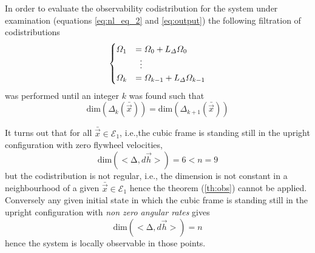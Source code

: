\par
In order to evaluate the observability codistribution for the system under examination
(equations \ref{eq:nl_eq_2} and \ref{eq:output}) the following filtration of codistributions
\[
\begin{cases}
\Omega_1 &= \Omega_0 + L_\Delta \Omega_0\\
&\vdotswithin{=} \\
\Omega_k &= \Omega_{k-1} + L_\Delta \Omega_{k-1}
\end{cases}
\]
was performed until an integer $k$ was found such that
\[
\mathrm{dim}(\Delta_{k}(\bar{\vec{x}})) = \mathrm{dim}(\Delta_{k + 1}(\bar{\vec{x}}))
\]
\par
It turns out that for all $\bar{\vec{x}} \in \mathcal{E}_{1}$, i.e.,the cubic frame
is standing still in the upright configuration with zero flywheel velocities,
\[
\mathrm{dim} (<\mathrm{\Delta},d\vec{h}>) = 6 < n = 9
\]
but the codistribution is not regular, i.e., the dimension is not constant in a neighbourhood
of a given $\bar{\vec{x}} \in \mathcal{E}_{1}$ hence the theorem (\ref{th:obs}) cannot be applied.
Conversely any given initial state in which the cubic frame is standing still in the upright
configuration with \emph{non zero angular rates} gives
\[
\mathrm{dim} (<\mathrm{\Delta},d\vec{h}>) = n
\]
hence the system is locally observable in those points.
\newpage
